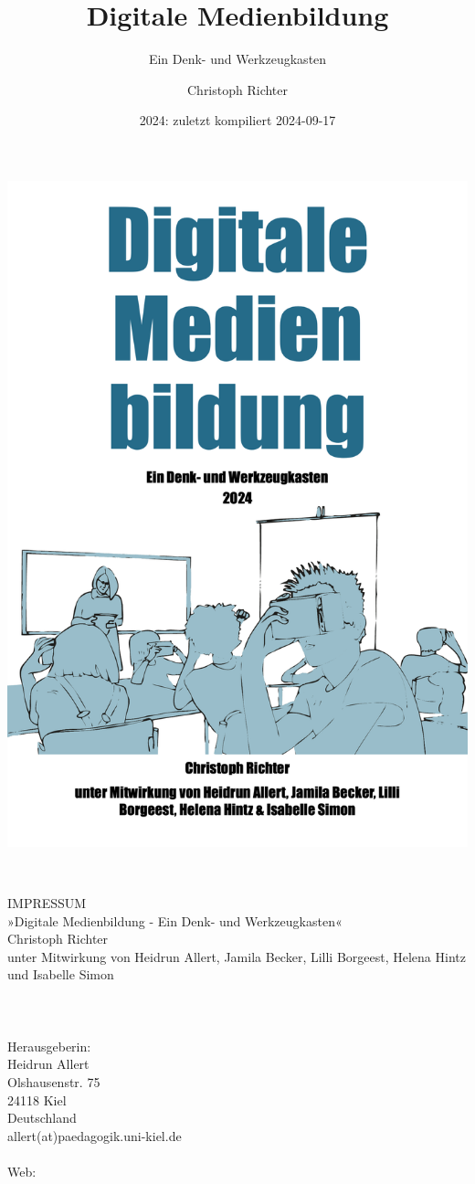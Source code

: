 \documentclass[
  a4paper,
]{book}
\title{Digitale Medienbildung}
\subtitle{Ein Denk- und Werkzeugkasten}
\author{Christoph Richter}
\date{2024: zuletzt kompiliert 2024-09-17}
\begin{document}
\maketitle


\includegraphics[width=\textwidth, height=0.99\textheight]{Figures/Cover.png}


\newpage
~\vfill
\thispagestyle{empty}

\noindent IMPRESSUM\\
\noindent »Digitale Medienbildung - Ein Denk- und Werkzeugkasten«\\
\noindent Christoph Richter\\
\noindent unter Mitwirkung von Heidrun Allert, Jamila Becker, Lilli Borgeest, Helena Hintz und Isabelle Simon\\
\\
\\
\\
\noindent Herausgeberin:\\
Heidrun Allert\\
Olshausenstr. 75\\
24118 Kiel\\
Deutschland\\
allert(at)paedagogik.uni-kiel.de\\
\\
\noindent Web:\\ %
\end{document}
